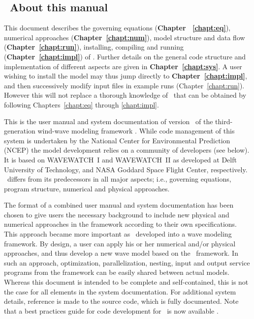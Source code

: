 \vssub
\subsection{~About this manual}
\vssub

This document describes the governing equations (\textbf{Chapter ~\ref{chapt:eq}}), numerical approaches (\textbf{Chapter~\ref{chapt:num}}),
model structure and data flow (\textbf{Chapter~\ref{chapt:run}}), installing, compiling and running (\textbf{Chapter~\ref{chapt:impl}}) of \ws. Further details on the general code 
structure and implementation of different aspects are given in \textbf{Chapter~\ref{chapt:sys}}. A user wishing to install the model 
may thus jump directly to \textbf{Chapter~\ref{chapt:impl}}, and then successively
modify input files in example runs (Chapter~\ref{chapt:run}). However this will not replace a thorough knowledge of \ws\ that can be obtained by
following Chapters~\ref{chapt:eq} through \ref{chapt:impl}.



This is the user manual and system documentation of version \WWver\ of the
third-generation wind-wave modeling framework \ww. While code management of this system is undertaken by the National Center for Environmental Prediction (NCEP) the model development relies on a community of developers (see below). It is based on WAVEWATCH~I and WAVEWATCH~II as developed at
Delft University of Technology, and NASA Goddard Space Flight Center,
respectively. \ws\ differs from its predecessors in all major aspects; i.e.,
governing equations, program structure, numerical and physical approaches.



The format of a combined user manual and
system documentation has been chosen to give users the necessary background
to include new physical and numerical approaches in the framework according to
their own specifications.  This approach became more important as \ws\
developed into a wave modeling framework. By design, a user can apply his or
her numerical and/or physical approaches, and thus develop a new wave model based
on the \ws\ framework. In such an approach, optimization, parallelization,
nesting, input and output service programs from the framework can be easily
shared between actual models.  Whereas this document is intended to be
complete and self-contained, this is not the case for all elements in the
system documentation. For additional system details, reference is made to the
source code, which is fully documented. Note that a best practices guide for
code development for \ws\ is now available \citep{tol:MMAB10a, tol:MMAB14b}.


